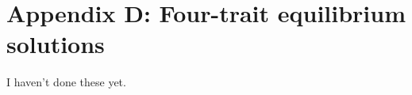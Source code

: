 \section*{Appendix D: Four-trait equilibrium solutions}

\renewcommand{\thefigure}{D\arabic{figure}}
\renewcommand{\theequation}{D\arabic{equation}}
\renewcommand{\thetable}{D\arabic{table}}
\setcounter{equation}{0}
\setcounter{figure}{0}
\setcounter{table}{0}



I haven't done these yet.

